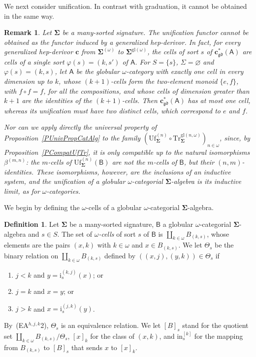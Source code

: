 \documentclass[a4paper, reqno
]{amsart}
\newcommand{\sig}[1]{\mathbf{#1}}             %
\newcommand{\calg}[1]{\boldsymbol{\mathsf{#1}}} %
\newcommand{\gd}{\mathfrak{gd}}              %
\newcommand{\gl}{\mathrm{gl}}                %
\newcommand{\Uf}{\mathrm{Uf}}
\newcommand{\Tr}{\mathrm{Tr}}
\theoremstyle{plain}
\newtheorem{remark}[theorem]{Remark}
\theoremstyle{definition}
\newtheorem{definition}[theorem]{Definition}
\begin{document}
We next consider unification.
In contrast with graduation, it cannot be obtained in the same way.

\begin{remark}\label{RUfOmegaNotDerivor}
Let $\sig{\Sigma}$ be a many-sorted signature.
The unification functor cannot be obtained as the functor induced by a generalized hep-derivor.
In fact, for every generalized hep-derivor $\mathbf{c}$ from $\sig{\Sigma}^{(\omega)}$ to $\sig{\Sigma}^{\gl(\omega)}$, the cells of sort $s$ of $\mathbf{c}^{\ast}_{\gd}(\calg{A})$ are cells of a single sort $\varphi(s)=(k,s')$ of $\calg{A}$.
For $S=\{s\}$, $\Sigma=\varnothing$ and $\varphi(s)=(k,s)$, let $\calg{A}$ be the globular $\omega$-category with exactly one cell in every dimension up to $k$, whose $(k+1)$-cells form the two-element monoid $\{e,f\}$, with $f\circ f=f$, for all the compositions, and whose cells of dimension greater than $k+1$ are the identities of the $(k+1)$-cells.
Then $\mathbf{c}^{\ast}_{\gd}(\calg{A})$ has at most one cell, whereas its unification must have two distinct cells, which correspond to $e$ and $f$.

Nor can we apply directly the universal property of Proposition~\ref{PUnivPropCatAlg} to the family $(\Uf^{(n)}_{\sig{\Sigma}}\circ \Tr^{\gl(n,\omega)}_{\sig{\Sigma}})_{n\in\omega}$, since, by Proposition~\ref{PCompatUfTr}, it is only compatible up to the natural isomorphisms $\beta^{(m,n)}$: the $m$-cells of $\Uf^{(n)}_{\sig{\Sigma}}(\calg{B})$ are not the $m$-cells of $\calg{B}$, but their $(n,m)$-identities.
These isomorphisms, however, are the inclusions of an inductive system, and the unification of a globular $\omega$-categorial $\sig{\Sigma}$-algebra is its inductive limit, as for $\omega$-categories.
\end{remark}

We begin by defining the $\omega$-cells of a globular $\omega$-categorial $\sig{\Sigma}$-algebra.

\begin{definition}\label{DUfOmegaCells}
Let $\sig{\Sigma}$ be a many-sorted signature, $\calg{B}$ a globular $\omega$-categorial $\sig{\Sigma}$-algebra and $s\in S$.
The set of \emph{$\omega$-cells} of sort $s$ of $\calg{B}$ is $\coprod_{k\in\omega}B_{(k,s)}$, whose elements are the pairs $(x,k)$ with $k\in\omega$ and $x\in B_{(k,s)}$.
We let $\Theta_{s}$ be the binary relation on $\coprod_{k\in\omega}B_{(k,s)}$ defined by $((x,j),(y,k))\in\Theta_{s}$ if
\begin{enumerate}
\item $j<k$ and $y=\mathrm{i}^{(k,j)}_{s}(x)$; or
\item $j=k$ and $x=y$; or
\item $j>k$ and $x=\mathrm{i}^{(j,k)}_{s}(y)$.
\end{enumerate}
By~(EA$^{h,j,k}$2), $\Theta_{s}$ is an equivalence relation.
We let $[B]_{s}$ stand for the quotient set $\coprod_{k\in\omega}B_{(k,s)}/\Theta_{s}$, $[x]_{k}$ for the class of $(x,k)$, and $\mathrm{in}^{[k]}_{s}$ for the mapping from $B_{(k,s)}$ to $[B]_{s}$ that sends $x$ to $[x]_{k}$.
\end{definition}
\end{document}

